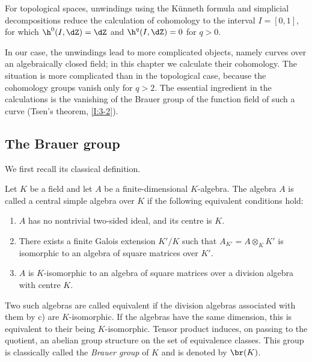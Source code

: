 For topological spaces, unwindings using the K\"unneth formula and
simplicial decompositions reduce the calculation of cohomology to the
interval $I=[0,1]$, for which $\h^0(I,\dZ)=\dZ$ and
$\h^q(I,\dZ)=0$ for $q>0$.

In our case, the unwindings lead to more complicated objects, namely curves
over an algebraically closed field; in this chapter we calculate their
cohomology. The situation is more complicated than in the topological case,
because the cohomology groups vanish only for $q>2$. The essential
ingredient in the calculations is the vanishing of the Brauer group of the
function field of such a curve (Tsen's theorem, \ref{I:3-2}).

\subsection{The Brauer group}\label{I:3-1}

We first recall its classical definition.

\begin{definition}\label{I:3-1-1}
Let $K$ be a field and let $A$ be a finite-dimensional $K$-algebra. The
algebra $A$ is called a central simple algebra over $K$ if the following
equivalent conditions hold:
\begin{enumerate}[\indent a)]
  \item $A$ has no nontrivial two-sided ideal, and its centre is $K$.
  \item There exists a finite Galois extension $K'/K$ such that
    $A_{K'}=A\otimes_KK'$ is isomorphic to an algebra of square matrices
    over $K'$.
  \item $A$ is $K$-isomorphic to an algebra of square matrices over a
    division algebra with centre $K$.
\end{enumerate}
\end{definition}

Two such algebras are called equivalent if the division algebras associated
with them by c) are $K$-isomorphic. If the algebras have the same
dimension, this is equivalent to their being $K$-isomorphic. Tensor product
induces, on passing to the quotient, an abelian group structure on the set
of equivalence classes. This group is classically called the
\emph{Brauer group} of $K$ and is denoted by $\br(K)$.

\subsubsection{}\label{I:3-1-2}

